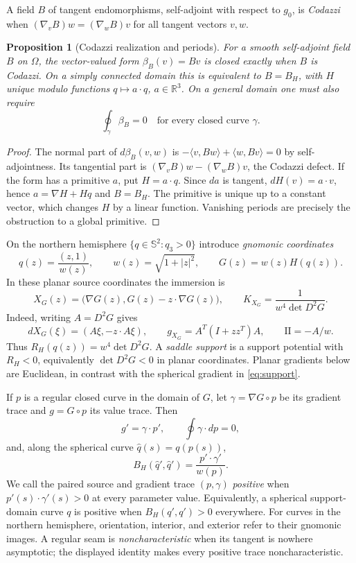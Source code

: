 \documentclass[11pt]{amsart}
\newtheorem{proposition}[theorem]{Proposition}
\theoremstyle{definition}
\theoremstyle{remark}
\newcommand{\R}{\mathbb R}\newcommand{\Sph}{\mathbb S}
\newcommand{\II}{\mathrm{II}}\newcommand{\Gmap}{\mathcal G}
\numberwithin{equation}{section}
\begin{document}
A field $B$ of tangent endomorphisms, self-adjoint with respect to $g_0$,
is \emph{Codazzi} when
$(\nabla_vB)w=(\nabla_wB)v$ for all tangent vectors $v,w$.
\begin{proposition}[Codazzi realization and periods]\label{prop:codazzi}
For a smooth self-adjoint field $B$ on $\Omega$, the vector-valued form
$\beta_B(v)=Bv$ is closed exactly when $B$ is Codazzi. On a simply
connected domain this is equivalent to $B=B_H$, with $H$ unique modulo
functions $q\mapsto a\cdot q$, $a\in\R^3$. On a general domain one must also require
\[
 \oint_\gamma\beta_B=0\quad\text{for every closed curve }\gamma.
\]
\end{proposition}
\begin{proof}
The normal part of $d\beta_B(v,w)$ is
$-\langle v,Bw\rangle+\langle w,Bv\rangle=0$ by self-adjointness.
Its tangential part is $(\nabla_vB)w-(\nabla_wB)v$, the Codazzi defect.
If the form has a primitive $a$, put $H=a\cdot q$. Since $da$ is tangent,
$dH(v)=a\cdot v$, hence $a=\nabla H+Hq$ and $B=B_H$.
The primitive is unique up to a constant vector, which changes $H$ by a
linear function. Vanishing periods are precisely the obstruction to a
global primitive.
\end{proof}

On the northern hemisphere $\{q\in\Sph^2:q_3>0\}$ introduce
\emph{gnomonic coordinates}
\[
 q(z)=\frac{(z,1)}{w(z)},\qquad w(z)=\sqrt{1+|z|^2},
 \qquad G(z)=w(z)H(q(z)).
\]
In these planar source coordinates the immersion is
\begin{equation}\label{eq:planar}
 X_G(z)=\bigl(\nabla G(z),G(z)-z\cdot\nabla G(z)\bigr),
 \qquad K_{X_G}=\frac1{w^4\det D^2G}.
\end{equation}
Indeed, writing $A=D^2G$ gives
\[
 dX_G(\xi)=(A\xi,-z\cdot A\xi),\qquad
 g_{X_G}=A^T(I+zz^T)A,\qquad \II=-A/w.
\]
Thus $R_H(q(z))=w^4\det D^2G$. A \emph{saddle support} is a support
potential with $R_H<0$, equivalently $\det D^2G<0$ in planar coordinates.
Planar gradients below are
Euclidean, in contrast with the spherical gradient in \eqref{eq:support}.

If $p$ is a regular closed curve in the domain of $G$, let
$\gamma=\nabla G\circ p$ be its
gradient trace and $g=G\circ p$ its value trace. Then
\begin{equation}\label{eq:action}
 g'=\gamma\cdot p',\qquad \oint\gamma\cdot dp=0,
\end{equation}
and, along the spherical curve $\widehat q(s)=q(p(s))$,
\begin{equation}\label{eq:tangent-sign}
 B_H(\widehat q',\widehat q')=\frac{p'\cdot\gamma'}{w(p)}.
\end{equation}
We call the paired source and gradient trace $(p,\gamma)$ \emph{positive}
when $p'(s)\cdot\gamma'(s)>0$ at every parameter value.
Equivalently, a spherical support-domain curve $q$ is positive when
$B_H(q',q')>0$ everywhere. For curves in the northern hemisphere,
orientation, interior, and exterior refer to their gnomonic images.
A regular seam is \emph{noncharacteristic} when its tangent is nowhere
asymptotic; the displayed identity makes every positive trace
noncharacteristic.
\end{document}
